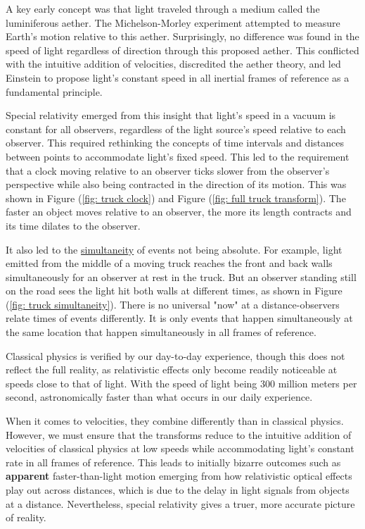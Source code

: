 A key early concept was that light traveled through a medium called the luminiferous aether.
The Michelson-Morley experiment attempted to measure Earth's motion relative to this aether.
Surprisingly, no difference was found in the speed of light regardless of direction through this proposed aether.
This conflicted with the intuitive addition of velocities, discredited the aether theory, and led Einstein to propose light's constant speed in all inertial frames of reference as a fundamental principle.

Special relativity emerged from this insight that light's speed in a vacuum is constant for all observers, regardless of the light source's speed relative to each observer.
This required rethinking the concepts of time intervals and distances between points to accommodate light's fixed speed.
This led to the requirement that a clock moving relative to an observer ticks slower from the observer's perspective while also being contracted in the direction of its motion.
This was shown in Figure (\ref{fig: truck clock}) and Figure (\ref{fig: full truck transform}).
The faster an object moves relative to an observer, the more its length contracts and its time dilates to the observer.

It also led to the \hyperlink{def-simultaneity}{simultaneity} of events not being absolute.
For example, light emitted from the middle of a moving truck reaches the front and back walls simultaneously for an observer at rest in the truck.
But an observer standing still on the road sees the light hit both walls at different times, as shown in Figure (\ref{fig: truck simultaneity}).
There is no universal "now" at a distance-observers relate times of events differently.
It is only events that happen simultaneously at the same location that happen simultaneously in all frames of reference.

Classical physics is verified by our day-to-day experience, though this does not reflect the full reality, as relativistic effects only become readily noticeable at speeds close to that of light.
With the speed of light being 300 million meters per second, astronomically faster than what occurs in our daily experience.

When it comes to velocities, they combine differently than in classical physics.
However, we must ensure that the transforms reduce to the intuitive addition of velocities of classical physics at low speeds while accommodating light's constant rate in all frames of reference.
This leads to initially bizarre outcomes such as \textbf{apparent} faster-than-light motion emerging from how relativistic optical effects play out across distances, which is due to the delay in light signals from objects at a distance.
Nevertheless, special relativity gives a truer, more accurate picture of reality.

